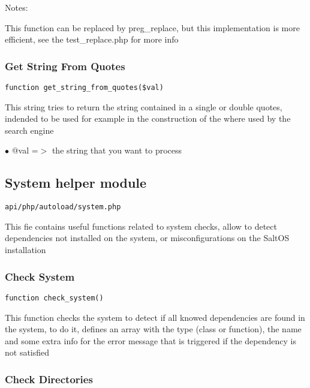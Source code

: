 \documentclass[a4paper]{article}
\begin{document}
Notes:

This function can be replaced by preg\_replace, but this implementation is
more efficient, see the test\_replace.php for more info

\hypertarget{toc253}{}
\subsubsection{Get String From Quotes}

\begin{lstlisting}
function get_string_from_quotes($val)
\end{lstlisting}

This string tries to return the string contained in a single or double
quotes, indended to be used for example in the construction of the where
used by the search engine

\begin{compactitem}
\item[\color{myblue}$\bullet$] @val =$>$ the string that you want to process
\end{compactitem}

\hypertarget{toc254}{}
\subsection{System helper module}

\begin{lstlisting}
api/php/autoload/system.php
\end{lstlisting}

This fie contains useful functions related to system checks, allow to detect dependencies not
installed on the system, or misconfigurations on the SaltOS installation

\hypertarget{toc255}{}
\subsubsection{Check System}

\begin{lstlisting}
function check_system()
\end{lstlisting}

This function checks the system to detect if all knowed dependencies are found in the system, to do it,
defines an array with the type (class or function), the name and some extra info for the error message
that is triggered if the dependency is not satisfied

\hypertarget{toc256}{}
\subsubsection{Check Directories}
\end{document}
